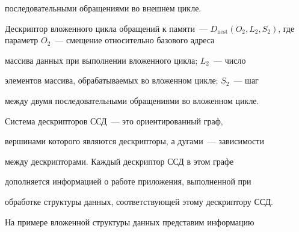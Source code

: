 


\noindent

 последовательными обращениями во внешнем цикле. 

    

    Дескриптор вложенного цикла обращений к памяти~--- $D_{\mathrm{nest}}(O_2, 

L_2, S_2)$, где параметр $O_2$~--- смещение относительно базового адреса 

массива данных при выполнении вложенного цикла; $L_2$~--- чис\-ло 

элементов массива, обрабатываемых во вложенном цикле; $S_2$~--- шаг 

между двумя последовательными обращениями во вложенном цикле.





       

    Система дескрипторов ССД~--- это ориентированный граф, 

вершинами которого являются дескрипторы, а дугами~--- зависимости 

между дескрипторами. Каждый дескриптор ССД в этом графе 

дополняется информацией о работе приложения, выполненной при 

обработке структуры данных, соответствующей этому дескриптору ССД.

    

    На примере вложенной структуры данных представим информацию 

